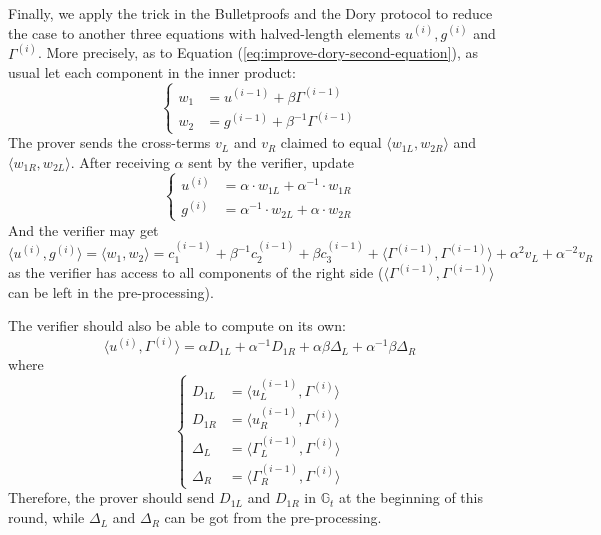 \documentclass{article}
\begin{document}
Finally, we apply the trick in the Bulletproofs and the Dory protocol to reduce the case to another three equations with halved-length elements $u^{(i)}, g^{(i)}$ and $\Gamma^{(i)}$. More precisely, as to Equation (\ref{eq:improve-dory-second-equation}), as usual let each component in the inner product:
\begin{equation*}
\begin{cases}
w_1 & = u^{(i-1)} + \beta \Gamma^{(i-1)} \\
w_2 & = g^{(i-1)} + \beta^{-1} \Gamma^{(i-1)}
\end{cases}
\end{equation*}
The prover sends the cross-terms $v_L$ and $v_R$ claimed to equal $\langle w_{1L}, w_{2R}\rangle$ and $\langle w_{1R}, w_{2L}\rangle$. After receiving $\alpha$ sent by the verifier, update
\begin{equation*}
\begin{cases}
u^{(i)} & = \alpha \cdot w_{1L} + \alpha^{-1} \cdot w_{1R} \\
g^{(i)} & = \alpha^{-1} \cdot w_{2L} + \alpha \cdot w_{2R}
\end{cases}
\end{equation*}
And the verifier may get 
\begin{equation} \label{eq:1-to-complete}
\langle u^{(i)}, g^{(i)} \rangle = \langle w_1, w_2\rangle = c_1^{(i-1)} + \beta^{-1} c_2^{(i-1)} + \beta c_3^{(i-1)} + \langle \Gamma^{(i-1)}, \Gamma^{(i-1)}\rangle + \alpha^2 v_L + \alpha^{-2} v_R
\end{equation}
as the verifier has access to all components of the right side ($\langle \Gamma^{(i-1)}, \Gamma^{(i-1)} \rangle$ can be left in the pre-processing). 

The verifier should also be able to compute on its own: 
\begin{equation} \label{eq:2-to-complete}
\langle u^{(i)}, \Gamma^{(i)}\rangle = \alpha D_{1L} + \alpha^{-1} D_{1R} + \alpha \beta \Delta_L + \alpha^{-1} \beta \Delta_R
\end{equation}
where
\begin{equation*}
\begin{cases}
D_{1L} & =  \langle u^{(i-1)}_{L}, \Gamma^{(i)}\rangle \\
D_{1R} & =  \langle u^{(i-1)}_{R}, \Gamma^{(i)}\rangle \\
\Delta_L & =  \langle \Gamma^{(i-1)}_L, \Gamma^{(i)}\rangle \\
\Delta_R & =  \langle \Gamma^{(i-1)}_R, \Gamma^{(i)}\rangle
\end{cases}
\end{equation*}
Therefore, the prover should send $D_{1L}$ and $D_{1R}$ in $\mathbb{G}_t$ at the beginning of this round, while $\Delta_L$ and $\Delta_R$ can be got from the pre-processing. 
\end{document}
